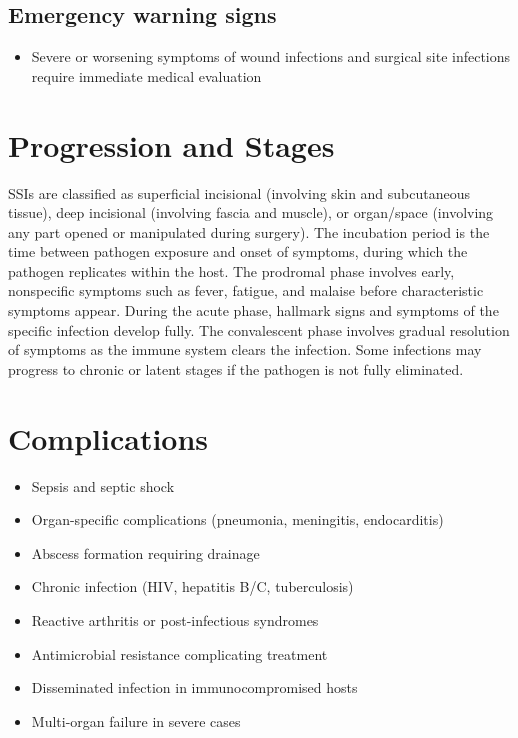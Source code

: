 \subsection{Emergency warning signs}
\begin{itemize}[noitemsep]
  \item Severe or worsening symptoms of wound infections and surgical site infections require immediate medical evaluation
\end{itemize}
\section{Progression and Stages}
SSIs are classified as superficial incisional (involving skin and subcutaneous tissue), deep incisional (involving fascia and muscle), or organ/space (involving any part opened or manipulated during surgery). The incubation period is the time between pathogen exposure and onset of symptoms, during which the pathogen replicates within the host. The prodromal phase involves early, nonspecific symptoms such as fever, fatigue, and malaise before characteristic symptoms appear. During the acute phase, hallmark signs and symptoms of the specific infection develop fully. The convalescent phase involves gradual resolution of symptoms as the immune system clears the infection. Some infections may progress to chronic or latent stages if the pathogen is not fully eliminated.
\section{Complications}
\begin{itemize}[noitemsep]
  \item Sepsis and septic shock
  \item Organ-specific complications (pneumonia, meningitis, endocarditis)
  \item Abscess formation requiring drainage
  \item Chronic infection (HIV, hepatitis B/C, tuberculosis)
  \item Reactive arthritis or post-infectious syndromes
  \item Antimicrobial resistance complicating treatment
  \item Disseminated infection in immunocompromised hosts
  \item Multi-organ failure in severe cases
\end{itemize}
